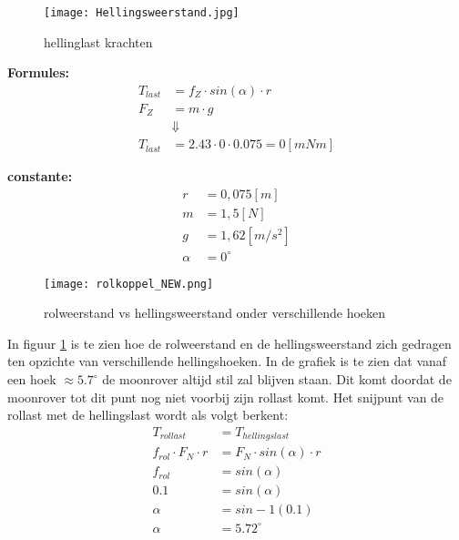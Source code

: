     \begin{figure}[H]
        \centering
        \texttt{[image: Hellingsweerstand.jpg]}
        \caption{hellinglast krachten}
    \end{figure}

    \begin{multicols}{2}
        \textbf{Formules:}
        \begin{equation}
            \begin{split}
                T_{last} &= f_{Z} \cdot sin(\alpha) \cdot r \\
                F_{Z} &= m \cdot g\\
                &\Downarrow \\
                T_{last} &= 2.43 \cdot 0 \cdot 0.075 = 0 [mNm]
            \end{split}
        \end{equation}

        \textbf{constante:}
        \begin{equation*}
            \begin{split}
                r &= 0,075 [m] \\
                m &= 1,5 [N] \\
                g &= 1,62 [m/s^2] \\
                \alpha &= 0^\circ 
            \end{split}
        \end{equation*}
    \end{multicols}

    \begin{figure}[H]
        \centering
        \texttt{[image: rolkoppel\_NEW.png]}
        \caption{rolweerstand vs hellingsweerstand onder verschillende hoeken}
        \label{fig:birds}
    \end{figure}

    In figuur \ref{fig:birds} is te zien hoe de rolweerstand en de hellingsweerstand zich gedragen ten opzichte van verschillende hellingshoeken. In de grafiek is te zien dat vanaf een hoek $\approx 5.7^\circ$ de moonrover altijd stil zal blijven staan. Dit komt doordat de moonrover tot dit punt nog niet voorbij zijn rollast komt. Het snijpunt van de rollast met de hellingslast wordt als volgt berkent:
    \begin{equation}
        \begin{split}
            T_{rollast} &= T_{hellingslast} \\
            f_{rol} \cdot F_{N} \cdot r &= F_{N} \cdot sin(\alpha) \cdot r \\
            f_{rol} &= sin(\alpha) \\
            0.1 &= sin(\alpha) \\
            \alpha &= sin-1(0.1) \\
            \alpha &= 5.72^\circ
        \end{split}
    \end{equation}

